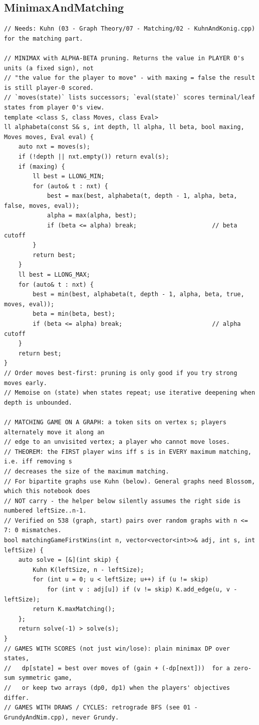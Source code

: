 \documentclass[9pt,a4paper,twocolumn]{extarticle}
\begin{document}
\subsection{MinimaxAndMatching}
\nopagebreak
\begin{lstlisting}
// Needs: Kuhn (03 - Graph Theory/07 - Matching/02 - KuhnAndKonig.cpp) for the matching part.

// MINIMAX with ALPHA-BETA pruning. Returns the value in PLAYER 0's units (a fixed sign), not
// "the value for the player to move" - with maxing = false the result is still player-0 scored.
// `moves(state)` lists successors; `eval(state)` scores terminal/leaf states from player 0's view.
template <class S, class Moves, class Eval>
ll alphabeta(const S& s, int depth, ll alpha, ll beta, bool maxing, Moves moves, Eval eval) {
    auto nxt = moves(s);
    if (!depth || nxt.empty()) return eval(s);
    if (maxing) {
        ll best = LLONG_MIN;
        for (auto& t : nxt) {
            best = max(best, alphabeta(t, depth - 1, alpha, beta, false, moves, eval));
            alpha = max(alpha, best);
            if (beta <= alpha) break;                     // beta cutoff
        }
        return best;
    }
    ll best = LLONG_MAX;
    for (auto& t : nxt) {
        best = min(best, alphabeta(t, depth - 1, alpha, beta, true, moves, eval));
        beta = min(beta, best);
        if (beta <= alpha) break;                         // alpha cutoff
    }
    return best;
}
// Order moves best-first: pruning is only good if you try strong moves early.
// Memoise on (state) when states repeat; use iterative deepening when depth is unbounded.

// MATCHING GAME ON A GRAPH: a token sits on vertex s; players alternately move it along an
// edge to an unvisited vertex; a player who cannot move loses.
// THEOREM: the FIRST player wins iff s is in EVERY maximum matching, i.e. iff removing s
// decreases the size of the maximum matching.
// For bipartite graphs use Kuhn (below). General graphs need Blossom, which this notebook does
// NOT carry - the helper below silently assumes the right side is numbered leftSize..n-1.
// Verified on 538 (graph, start) pairs over random graphs with n <= 7: 0 mismatches.
bool matchingGameFirstWins(int n, vector<vector<int>>& adj, int s, int leftSize) {
    auto solve = [&](int skip) {
        Kuhn K(leftSize, n - leftSize);
        for (int u = 0; u < leftSize; u++) if (u != skip)
            for (int v : adj[u]) if (v != skip) K.add_edge(u, v - leftSize);
        return K.maxMatching();
    };
    return solve(-1) > solve(s);
}
// GAMES WITH SCORES (not just win/lose): plain minimax DP over states,
//   dp[state] = best over moves of (gain + (-dp[next]))  for a zero-sum symmetric game,
//   or keep two arrays (dp0, dp1) when the players' objectives differ.
// GAMES WITH DRAWS / CYCLES: retrograde BFS (see 01 - GrundyAndNim.cpp), never Grundy.
\end{lstlisting}
\end{document}
